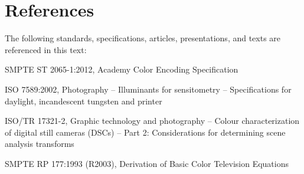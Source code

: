 \numberedformat
\chapter{References}
The following standards, specifications, articles, presentations, and texts are referenced in this text:

SMPTE ST 2065-1:2012, Academy Color Encoding Specification

ISO 7589:2002, Photography -- Illuminants for sensitometry -- Specifications for daylight, incandescent tungsten and printer

ISO/TR 17321-2, Graphic technology and photography -- Colour characterization of digital still cameras (DSCs) -- Part 2: Considerations for determining scene analysis transforms

SMPTE RP 177:1993 (R2003), Derivation of Basic Color Television Equations
